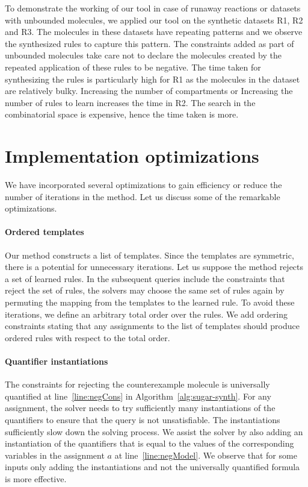   To demonstrate the working of our tool in case of runaway reactions or datasets with unbounded molecules, we applied our tool on the synthetic datasets R1, R2 and R3. The molecules in these datasets have repeating patterns and we observe the synthesized rules to capture this pattern. The constraints added as part of unbounded molecules take care not to declare the molecules created by the repeated application of these rules to be negative. The time taken for synthesizing the rules is particularly high for R1 as the molecules in the dataset are relatively bulky. Increasing the number of compartments or Increasing the number of rules to learn increases the time in R2. The search in the combinatorial space is expensive, hence the time taken is more. 
  
\section{Implementation optimizations}

We have incorporated several optimizations to gain efficiency or reduce
the number of iterations in the method. Let us discuss some of the remarkable
optimizations.

\paragraph{Ordered templates}
Our method constructs a list of templates.
Since the templates are symmetric, there is a potential for unnecessary
iterations.
Let us suppose the method rejects a set of learned rules.
In the subsequent queries include the constraints that reject the set of rules,
the solvers may choose the same set of rules again by permuting the mapping
from the templates to the learned rule.
To avoid these iterations, we define an arbitrary total order over the rules.
We add ordering constraints stating that any assignments to the list of templates should produce
ordered rules with respect to the total order.

\paragraph{Quantifier instantiations}
The constraints for rejecting the counterexample molecule is universally quantified at line~\ref{line:negCons} in Algorithm~\ref{alg:sugar-synth}.
For any assignment, the solver needs to try sufficiently many instantiations of the quantifiers
to ensure that the query is not unsatisfiable.
The instantiations sufficiently slow down the solving process.
We assist the solver by also adding an instantiation of the quantifiers that is equal
to the values of the corresponding variables in the assignment $a$ at line~\ref{line:negModel}.
We observe that for some inputs only adding the instantiations and not the universally quantified
formula is more effective.

